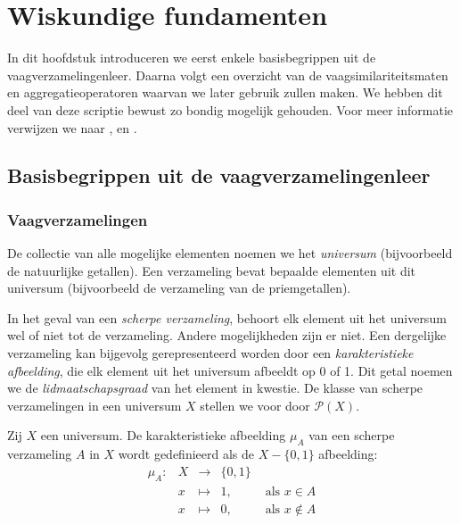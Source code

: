 \chapter{Wiskundige fundamenten}

In dit hoofdstuk introduceren we eerst enkele basisbegrippen uit de vaagverzamelingenleer. 
Daarna volgt een overzicht van de vaagsimilariteitsmaten en aggregatieoperatoren waarvan
we later gebruik zullen maken. We hebben dit deel van deze scriptie bewust zo 
bondig mogelijk gehouden. Voor meer informatie verwijzen
we naar \cite{kerre:vaagmodellen}, \cite{vanderweken:similariteitsmaten} en 
\cite{victor:aggregatieoperatoren}.


\section{Basisbegrippen uit de vaagverzamelingenleer}

\subsection{Vaagverzamelingen}

De collectie van alle mogelijke elementen noemen we het \emph{universum} (bijvoorbeeld de
natuurlijke getallen). Een verzameling bevat bepaalde elementen uit dit universum (bijvoorbeeld de 
verzameling van de priemgetallen). 

In het geval van een \emph{scherpe verzameling}, behoort elk 
element uit het universum wel of niet tot de verzameling. Andere mogelijkheden zijn er
niet. Een dergelijke verzameling kan bijgevolg 
gerepresenteerd worden door een \emph{karakteristieke afbeelding}, die elk element uit het 
universum afbeeldt op 0 of 1. Dit getal noemen we de \emph{lidmaatschapsgraad} van het element 
in kwestie. De klasse van scherpe verzamelingen in een universum $X$ stellen we voor door 
$\mathcal{P}(X)$.
\begin{definitie}
Zij $X$ een universum. De karakteristieke afbeelding $\mu_A$ van een scherpe verzameling $A$ in $X$
wordt gedefinieerd als de $X - \{0,1\}$ afbeelding:
$$
\begin{array}{lllll}
\mu_A: 	& X & \to 		& \{0,1\}	& \\
		& x & \mapsto 	& 1,		& \textrm{ als } x \in A \\
		& x & \mapsto 	& 0,		& \textrm{ als } x \notin A
\end{array}
$$
\end{definitie}

